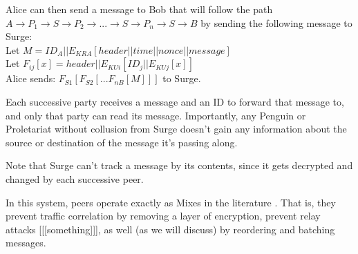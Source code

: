 \documentclass[twocolumn,11pt,english]{article}
\begin{document}
Alice can then send a message to Bob that will follow the path $A \rightarrow P_1 \rightarrow S \rightarrow P_2 \rightarrow ... \rightarrow S \rightarrow P_n \rightarrow S \rightarrow B$ by sending the following message to Surge: 
\\
Let \scriptsize$M = ID_A||E_{KRA}[ header || time || nonce || message ]$
\normalsize
\\Let \scriptsize$F_{ij}[x] = header||E_{KUi}[ ID_j || E_{KUj}[ x ] ]$
\normalsize
\\
Alice sends: $F_{S1}[F_{S2}[...F_{nB}[ M ]]]$ to Surge. 

Each successive party receives a message and an ID to forward that message to, and only that party can read its message. Importantly, any Penguin or Proletariat without collusion from Surge doesn't gain any information about the source or destination of the message it's passing along. 

Note that Surge can't track a message by its contents, since it gets decrypted and changed by each successive peer. 

In this system, peers operate exactly as Mixes in the literature \cite{chaum-mix} . That is, they prevent traffic correlation by removing a layer of encryption, prevent relay attacks [[[something]]], as well (as we will discuss) by reordering and batching messages. 
\end{document}
